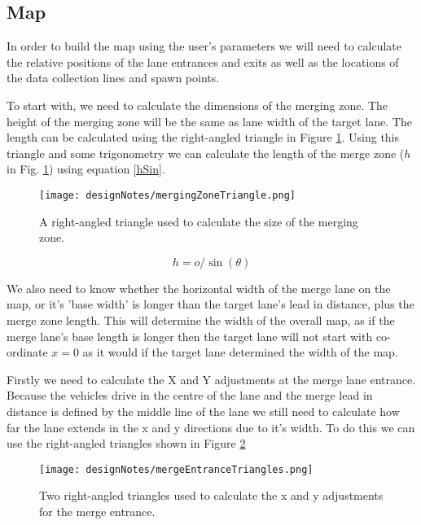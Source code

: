 \subsection{Map}
\label{subsec:Map}
In order to build the map using the user's parameters we will need to calculate the relative positions of the lane entrances and exits as well as the locations of the data collection lines and spawn points.

To start with, we need to calculate the dimensions of the merging zone. The height of the merging zone will be the same as lane width of the target lane. The length can be calculated using the right-angled triangle in Figure \ref{fig:mergingZoneTriangle}. Using this triangle and some trigonometry we can calculate the length of the merge zone ($h$ in Fig. \ref{fig:mergingZoneTriangle}) using equation \ref{hSin}.

\begin{figure}[htb]
\texttt{[image: designNotes/mergingZoneTriangle.png]}
\caption{A right-angled triangle used to calculate the size of the merging zone.}
\label{fig:mergingZoneTriangle}
\end{figure}

\begin{equation}\label{hSin}
h = o / \sin(\theta)
\end{equation}

We also need to know whether the horizontal width of the merge lane on the map, or it's 'base width' is longer than the target lane's lead in distance, plus the merge zone length. This will determine the width of the overall map, as if the merge lane's base length is longer then the target lane will not start with co-ordinate $x=0$ as it would if the target lane determined the width of the map.

Firstly we need to calculate the X and Y adjustments at the merge lane entrance. Because the vehicles drive in the centre of the lane and the merge lead in distance is defined by the middle line of the lane we still need to calculate how far the lane extends in the x and y directions due to it's width. To do this we can use the right-angled triangles shown in Figure \ref{fig:mergeEntranceTriangles}

\begin{figure}[htb]
\texttt{[image: designNotes/mergeEntranceTriangles.png]}
\caption{Two right-angled triangles used to calculate the x and y adjustments for the merge entrance.}
\label{fig:mergeEntranceTriangles}
\end{figure}

